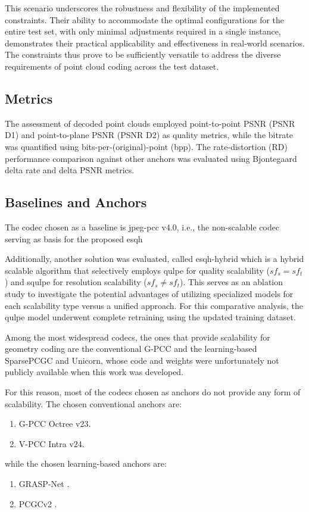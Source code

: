 This scenario underscores the robustness and flexibility of the implemented constraints. Their ability to accommodate the optimal configurations for the entire test set, with only minimal adjustments required in a single instance, demonstrates their practical applicability and effectiveness in real-world scenarios. The constraints thus prove to be sufficiently versatile to address the diverse requirements of point cloud coding across the test dataset.

\subsection{Metrics}
The assessment of decoded point clouds employed point-to-point PSNR (PSNR D1) and point-to-plane PSNR (PSNR D2) as quality metrics, while the bitrate was quantified using bits-per-(original)-point (bpp). The rate-distortion (RD) performance comparison against other anchors was evaluated using Bjontegaard delta rate and delta PSNR metrics.

\subsection{Baselines and Anchors}

The codec chosen as a baseline is \gls{jpeg-pcc} v4.0, i.e., the non-scalable codec serving as basis for the proposed \gls{esqh}

Additionally, another solution was evaluated, called \gls{esqh}-hybrid which is a hybrid scalable algorithm that selectively employs \gls{qulpe} for quality scalability ($sf_s = sf_t$) and \gls{squlpe} for resolution scalability ($sf_s \neq sf_t$).
This serves as an ablation study to investigate the potential advantages of utilizing specialized models for each scalability type versus a unified approach. For this comparative analysis, the \gls{qulpe} model underwent complete retraining using the updated training dataset.

Among the most widespread codecs, the ones that provide scalability for geometry coding are the conventional G-PCC and the learning-based SparsePCGC \cite{wang2022sparse} and Unicorn, \cite{wang2024versatile1,wang2024versatile2}
whose code and weights were unfortunately not publicly available when this work was developed.

For this reason, most of the codecs chosen as anchors do not provide any form of scalability. The chosen conventional anchors are: 
\begin{enumerate}
    \item G-PCC Octree v23.
    \item V-PCC Intra v24.
\end{enumerate}
while the chosen learning-based anchors are:
\begin{enumerate}
    \item GRASP-Net \cite{pang2022grasp}.
    \item PCGCv2 \cite{wang2021lossy}.
\end{enumerate}




